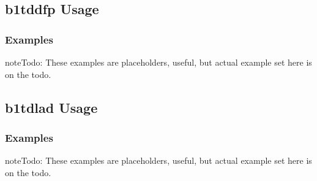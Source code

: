 \documentclass[letterpaper,10pt,english]{sphinxmanual}
\begin{document}
\subsection{b1tddfp Usage}
\label{\detokenize{b1tddfp-usage:b1tddfp-usage}}\label{\detokenize{b1tddfp-usage::doc}}

\subsubsection{Examples}
\label{\detokenize{b1tddfp-usage:examples}}
\begin{sphinxadmonition}{note}{\label{\detokenize{b1tddfp-usage:id1}}Todo:}
\sphinxAtStartPar
These examples are placeholders, useful, but actual example set here is on
the todo.
\end{sphinxadmonition}

\begin{sphinxVerbatim}[commandchars=\\\{\}]
 
  
  
   
\end{sphinxVerbatim}


\subsection{b1tdlad Usage}
\label{\detokenize{b1tdlad-usage:b1tdlad-usage}}\label{\detokenize{b1tdlad-usage::doc}}

\subsubsection{Examples}
\label{\detokenize{b1tdlad-usage:examples}}
\begin{sphinxadmonition}{note}{\label{\detokenize{b1tdlad-usage:id1}}Todo:}
\sphinxAtStartPar
These examples are placeholders, useful, but actual example set here is on
the todo.
\end{sphinxadmonition}

\begin{sphinxVerbatim}[commandchars=\\\{\}]
 
  
\end{sphinxVerbatim}
\end{document}
